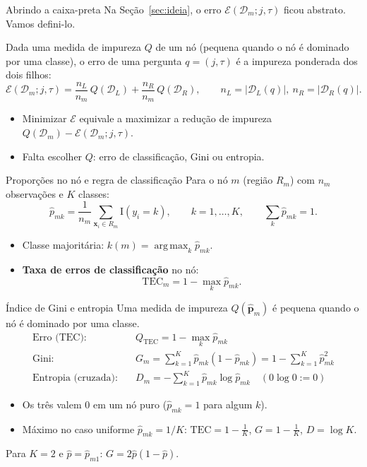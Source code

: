 \documentclass[aspectratio=169]{beamer}
\DeclareMathOperator*{\argmax}{arg\,max}
\newcommand{\ind}{\mathrm{I}}   %
\newcommand{\Q}{Q}
\newcommand{\Err}{\mathcal E}
\newcommand{\TEC}{\mathrm{TEC}}
\begin{document}
\begin{frame}{Abrindo a caixa-preta}
Na Seção~\ref{sec:ideia}, o erro $\Err(\mathcal D_m;j,\tau)$ ficou abstrato. Vamos defini-lo.

\vspace{6pt}
Dada uma \alert{medida de impureza} $\Q$ de um nó (pequena quando o nó é dominado por uma classe), o erro de uma pergunta $q=(j,\tau)$ é a impureza \alert{ponderada} dos dois filhos:
\[
\Err(\mathcal D_m;j,\tau)=\frac{n_L}{n_m}\,\Q(\mathcal D_L)+\frac{n_R}{n_m}\,\Q(\mathcal D_R),\qquad n_L=|\mathcal D_L(q)|,\ n_R=|\mathcal D_R(q)|.
\]
\begin{itemize}
  \item Minimizar $\Err$ equivale a maximizar a \alert{redução de impureza} $\Q(\mathcal D_m)-\Err(\mathcal D_m;j,\tau)$.
  \item Falta escolher $\Q$: erro de classificação, Gini ou entropia.
\end{itemize}
\end{frame}

\begin{frame}{Proporções no nó e regra de classificação}
Para o nó $m$ (região $R_m$) com $n_m$ observações e $K$ classes:
\[
\hat p_{mk}=\frac1{n_m}\sum_{\mathbf x_i\in R_m}\ind(y_i=k),\qquad k=1,\dots,K,
\qquad \sum_k\hat p_{mk}=1.
\]
\begin{itemize}
  \item Classe majoritária: $k(m)=\argmax_k \hat p_{mk}$.
  \item \textbf{Taxa de erros de classificação} no nó:
  \[
  \TEC_m=1-\max_k\hat p_{mk}.
  \]
\end{itemize}
\end{frame}

\begin{frame}{Índice de Gini e entropia}
Uma \alert{medida de impureza} $\Q(\hat{\mathbf p}_m)$ é pequena quando o nó é dominado por uma classe.
\begin{align*}
\text{Erro (TEC):}\quad & \Q_{\TEC}=1-\max_k\hat p_{mk}\\
\text{Gini:}\quad & G_m=\sum_{k=1}^K \hat p_{mk}(1-\hat p_{mk})=1-\sum_{k=1}^K\hat p_{mk}^2\\
\text{Entropia (cruzada):}\quad & D_m=-\sum_{k=1}^K\hat p_{mk}\log\hat p_{mk}\quad(0\log0:=0)
\end{align*}
\begin{itemize}
  \item Os três valem $0$ em um nó \alert{puro} ($\hat p_{mk}=1$ para algum $k$).
  \item Máximo no caso uniforme $\hat p_{mk}=1/K$: $\TEC=1-\tfrac1K$, $G=1-\tfrac1K$, $D=\log K$.
\end{itemize}
{\footnotesize Para $K=2$ e $\hat p=\hat p_{m1}$: $G=2\hat p(1-\hat p)$.}
\end{frame}
\end{document}
